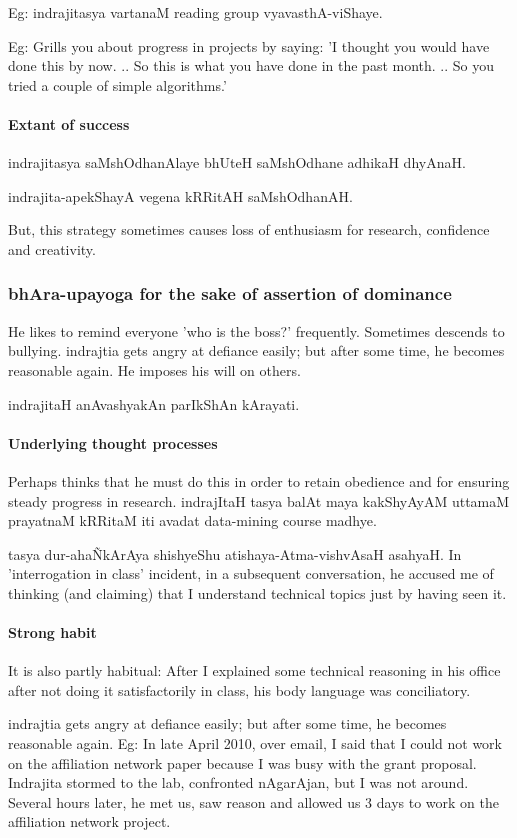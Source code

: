 \documentclass[oneside, article]{memoir}
\begin{document}
Eg: indrajitasya vartanaM reading group vyavasthA-viShaye.

Eg: Grills you about progress in projects by saying: 'I thought you would have done this by now. .. So this is what you have done in the past month. .. So you tried a couple of simple algorithms.'

\paragraph*{Extant of success}
indrajitasya saMshOdhanAlaye bhUteH saMshOdhane adhikaH dhyAnaH.

indrajita-apekShayA vegena kRRitAH saMshOdhanAH.

But, this strategy sometimes causes loss of enthusiasm for research, confidence and creativity.

\subsubsection{bhAra-upayoga for the sake of assertion of dominance}
He likes to remind everyone 'who is the boss?' frequently. Sometimes descends to bullying. indrajtia gets angry at defiance easily; but after some time, he becomes reasonable again. He imposes his will on others.

indrajitaH anAvashyakAn parIkShAn kArayati.

\paragraph*{Underlying thought processes}
Perhaps thinks that he must do this in order to retain obedience and for ensuring steady progress in research. indrajItaH tasya balAt maya kakShyAyAM uttamaM prayatnaM kRRitaM iti avadat data-mining course madhye.

tasya dur-aha\~NkArAya shishyeShu atishaya-Atma-vishvAsaH asahyaH. In 'interrogation in class' incident, in a subsequent conversation, he accused me of thinking (and claiming) that I understand technical topics just by having seen it.

\paragraph*{Strong habit}
It is also partly habitual: After I explained some technical reasoning in his office after not doing it satisfactorily in class, his body language was conciliatory.

indrajtia gets angry at defiance easily; but after some time, he becomes reasonable again. Eg: In late April 2010, over email, I said that I could not work on the affiliation network paper because I was busy with the grant proposal. Indrajita stormed to the lab, confronted nAgarAjan, but I was not around. Several hours later, he met us, saw reason and allowed us 3 days to work on the affiliation network project.
\end{document}
